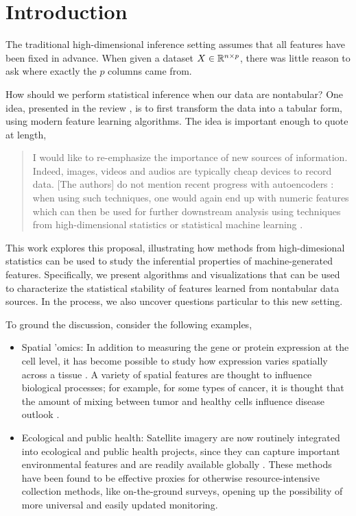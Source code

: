 \section{Introduction}

The traditional high-dimensional inference setting assumes that all features
have been fixed in advance. When given a dataset $X \in \mathbb{R}^{n \times p}$,
there was little reason to ask where exactly the $p$ columns came from. 


How should we perform statistical inference when our data are nontabular? One
idea, presented in the review \citep{buhlmann2019comments}, is to first
transform the data into a tabular form, using modern feature learning
algorithms. The idea is important enough to quote at length,

\begin{quote}
I would like to re-emphasize the importance of new sources of information.
Indeed, images, videos and audios are typically cheap devices to record data.
[The authors] do not mention recent progress with autoencoders
\citep{hinton2006reducing, vincent2010stacked}: when using such techniques, one
would again end up with numeric features which can then be used for further
downstream analysis using techniques from high-dimensional statistics or
statistical machine learning \citep{hastie2015statistical,
  buhlmann2011statistics}.
\end{quote}

This work explores this proposal, illustrating how methods from high-dimesional
statistics can be used to study the inferential properties of machine-generated
features. Specifically, we present algorithms and visualizations that can be
used to characterize the statistical stability of features learned from
nontabular data sources. In the process, we also uncover questions particular to
this new setting.

To ground the discussion, consider the following examples,

\begin{itemize}
\item Spatial 'omics: In addition to measuring the gene or protein expression at
  the cell level, it has become possible to study how expression varies
  spatially across a tissue \citep{burgess2019spatial, lundberg2019spatial}. A
  variety of spatial features are thought to influence biological processes; for
  example, for some types of cancer, it is thought that the amount of mixing
  between tumor and healthy cells influence disease outlook
  \citep{keren2018structured}.
\item Ecological and public health: Satellite imagery are now routinely
  integrated into ecological and public health projects, since they can capture
  important environmental features and are readily available globally
  \citep{jean2016combining, wu2020air, bondimapping}. These methods have been found to be effective
  proxies for otherwise resource-intensive collection methods, like
  on-the-ground surveys, opening up the possibility of more universal and easily
  updated monitoring.
\end{itemize}



